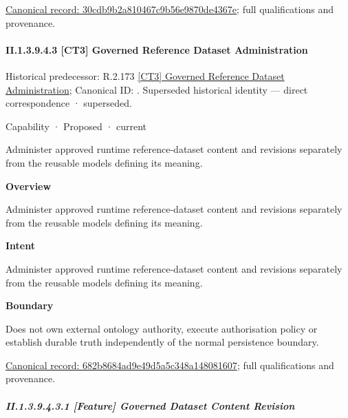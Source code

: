 {\footnotesize \href{../../../../../../../continuum/strategy/capability/feature/30cdb9b2a810467c9b56e9870de4367e.md}{Canonical record: 30cdb9b2a810467c9b56e9870de4367e}; full qualifications and provenance.}\par
\paragraph*{II.1.3.9.4.3 [CT3] Governed Reference Dataset Administration}
\label{navigation:II.1.3.9.4.3}

{\small Historical predecessor: R.2.173 \hyperref[element:15d972931ed6447797c30a5ddb71737e]{[CT3] Governed Reference Dataset Administration}; Canonical ID: \texttt{}. Superseded historical identity — direct correspondence · superseded.}\par
\label{element:682b8684ad9e49d5a5c348a148081607}
{\small Capability · Proposed · current}\par

Administer approved runtime reference-dataset content and revisions separately from the reusable models defining its meaning.



\textbf{Overview}



Administer approved runtime reference-dataset content and revisions separately from the reusable models defining its meaning.



\textbf{Intent}



Administer approved runtime reference-dataset content and revisions separately from the reusable models defining its meaning.



\textbf{Boundary}



Does not own external ontology authority, execute authorisation policy or establish durable truth independently of the normal persistence boundary.


{\footnotesize \href{../../../../../../../continuum/strategy/capability/682b8684ad9e49d5a5c348a148081607.md}{Canonical record: 682b8684ad9e49d5a5c348a148081607}; full qualifications and provenance.}\par
\subparagraph*{II.1.3.9.4.3.1 [Feature] Governed Dataset Content Revision}
\label{navigation:II.1.3.9.4.3.1}

